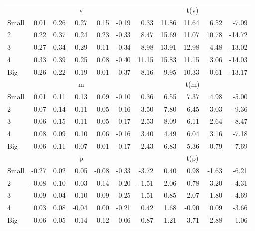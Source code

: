 \begin{table}[!ht]
\begin{tabular}{lrrrrrrrrrr}
  
     & \multicolumn{5}{c}{v} & \multicolumn{5}{c}{t(v)}   \\
     \cmidrule(r){2-6} \cmidrule(r){7-11} 
    Small  & 0.01  & 0.26  & 0.27  & 0.15  & -0.19  & 0.33  & 11.86  & 11.64  & 6.52  & -7.09   \\
    2  & 0.22  & 0.37  & 0.24  & 0.23  & -0.33  & 8.47  & 15.69  & 11.07  & 10.78  & -14.72   \\
    3  & 0.27  & 0.34  & 0.29  & 0.11  & -0.34  & 8.98  & 13.91  & 12.98  & 4.48  & -13.02   \\
    4  & 0.33  & 0.39  & 0.25  & 0.08  & -0.40  & 11.15  & 15.83  & 11.15  & 3.06  & -14.03   \\
    Big  & 0.26  & 0.22  & 0.19  & -0.01  & -0.37  & 8.16  & 9.95  & 10.33  & -0.61  & -13.17   \\
    
  
     & \multicolumn{5}{c}{m} & \multicolumn{5}{c}{t(m)}   \\
     \cmidrule(r){2-6} \cmidrule(r){7-11} 
    Small  & 0.01  & 0.11  & 0.13  & 0.09  & -0.10  & 0.36  & 6.55  & 7.37  & 4.98  & -5.00   \\
    2  & 0.07  & 0.14  & 0.11  & 0.05  & -0.16  & 3.50  & 7.80  & 6.45  & 3.03  & -9.36   \\
    3  & 0.06  & 0.15  & 0.11  & 0.05  & -0.17  & 2.53  & 8.09  & 6.11  & 2.64  & -8.47   \\
    4  & 0.08  & 0.09  & 0.10  & 0.06  & -0.16  & 3.40  & 4.49  & 6.04  & 3.16  & -7.18   \\
    Big  & 0.06  & 0.11  & 0.07  & 0.01  & -0.17  & 2.43  & 6.83  & 5.36  & 0.79  & -7.69   \\
    
  
     & \multicolumn{5}{c}{p} & \multicolumn{5}{c}{t(p)}   \\
     \cmidrule(r){2-6} \cmidrule(r){7-11} 
    Small  & -0.27  & 0.02  & 0.05  & -0.08  & -0.33  & -3.72  & 0.40  & 0.98  & -1.63  & -6.21   \\
    2  & -0.08  & 0.10  & 0.03  & 0.14  & -0.20  & -1.51  & 2.06  & 0.78  & 3.20  & -4.31   \\
    3  & 0.09  & 0.04  & 0.10  & 0.09  & -0.25  & 1.51  & 0.85  & 2.07  & 1.80  & -4.69   \\
    4  & 0.03  & 0.08  & -0.04  & 0.00  & -0.21  & 0.42  & 1.68  & -0.90  & 0.09  & -3.66   \\
    Big  & 0.06  & 0.05  & 0.14  & 0.12  & 0.06  & 0.87  & 1.21  & 3.71  & 2.88  & 1.06   \\
    
  
  \bottomrule
\end{tabular}
\label{tbl:25_Size_Inv_B16}
\end{table}